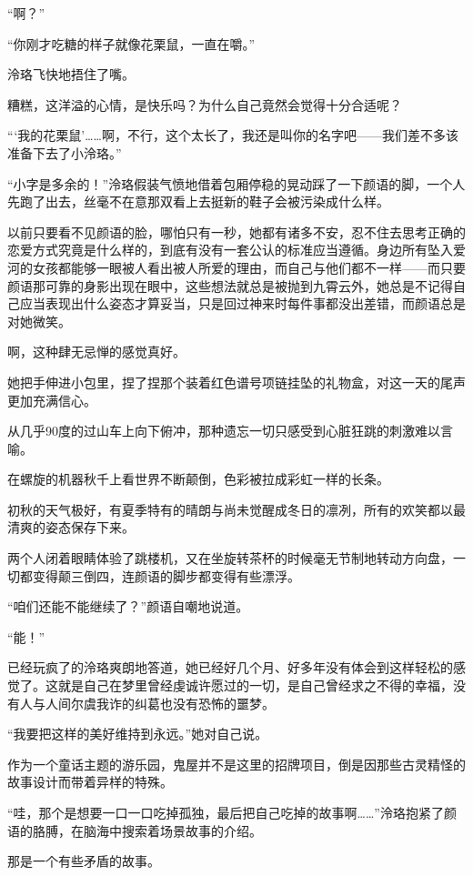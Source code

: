 \documentclass[UTF8, scheme = chinese, openany]{ctexbook}
\begin{document}
“啊？”

“你刚才吃糖的样子就像花栗鼠，一直在嚼。”

泠珞飞快地捂住了嘴。

糟糕，这洋溢的心情，是快乐吗？为什么自己竟然会觉得十分合适呢？

“‘我的花栗鼠’……啊，不行，这个太长了，我还是叫你的名字吧——我们差不多该准备下去了小泠珞。”

“小字是多余的！”泠珞假装气愤地借着包厢停稳的晃动踩了一下颜语的脚，一个人先跑了出去，丝毫不在意那双看上去挺新的鞋子会被污染成什么样。

以前只要看不见颜语的脸，哪怕只有一秒，她都有诸多不安，忍不住去思考正确的恋爱方式究竟是什么样的，到底有没有一套公认的标准应当遵循。身边所有坠入爱河的女孩都能够一眼被人看出被人所爱的理由，而自己与他们都不一样——而只要颜语那可靠的身影出现在眼中，这些想法就总是被抛到九霄云外，她总是不记得自己应当表现出什么姿态才算妥当，只是回过神来时每件事都没出差错，而颜语总是对她微笑。

啊，这种肆无忌惮的感觉真好。

她把手伸进小包里，捏了捏那个装着红色谱号项链挂坠的礼物盒，对这一天的尾声更加充满信心。

\vspace{1.5em}

从几乎90度的过山车上向下俯冲，那种遗忘一切只感受到心脏狂跳的刺激难以言喻。

在螺旋的机器秋千上看世界不断颠倒，色彩被拉成彩虹一样的长条。

初秋的天气极好，有夏季特有的晴朗与尚未觉醒成冬日的凛冽，所有的欢笑都以最清爽的姿态保存下来。

两个人闭着眼睛体验了跳楼机，又在坐旋转茶杯的时候毫无节制地转动方向盘，一切都变得颠三倒四，连颜语的脚步都变得有些漂浮。

“咱们还能不能继续了？”颜语自嘲地说道。

“能！”

已经玩疯了的泠珞爽朗地答道，她已经好几个月、好多年没有体会到这样轻松的感觉了。这就是自己在梦里曾经虔诚许愿过的一切，是自己曾经求之不得的幸福，没有人与人间尔虞我诈的纠葛也没有恐怖的噩梦。

“我要把这样的美好维持到永远。”她对自己说。

作为一个童话主题的游乐园，鬼屋并不是这里的招牌项目，倒是因那些古灵精怪的故事设计而带着异样的特殊。

“哇，那个是想要一口一口吃掉孤独，最后把自己吃掉的故事啊……”泠珞抱紧了颜语的胳膊，在脑海中搜索着场景故事的介绍。

那是一个有些矛盾的故事。
\end{document}
